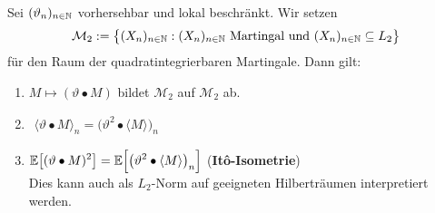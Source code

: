 \begin{proposition}\label{prop2.6}
	Sei $(\vartheta_n)_{n\in\mathbb{N}}$ vorhersehbar und lokal beschränkt. Wir setzen
	\begin{align*}
		\mathcal{M}_2:=\big\lbrace (X_n)_{n\in\mathbb{N}}:(X_n)_{n\in\mathbb{N}}\text{ Martingal und }(X_n)_{n\in\mathbb{N}}\subseteq L_2\big\rbrace
	\end{align*}
	für den Raum der quadratintegrierbaren Martingale. Dann gilt:
	\begin{enumerate}[label=(\alph*)]
		\item $M\mapsto(\vartheta\bullet M)$ bildet $\mathcal{M}_2$ auf $\mathcal{M}_2$ ab.
		\item $\begin{aligned}
			\langle\vartheta\bullet M\rangle_n=\big(\vartheta^2\bullet\langle M\rangle\big)_n
		\end{aligned}$
		\item $\begin{aligned}
			\mathbb{E}\big[(\vartheta\bullet M)^2\big]=\mathbb{E}\Big[\big(\vartheta^2\bullet\langle M\rangle\big)_n\Big]
		\end{aligned}$ (\textbf{It\^o-Isometrie})\\
		Dies kann auch als $L_2$-Norm auf geeigneten Hilberträumen interpretiert werden.
	\end{enumerate}
\end{proposition}


